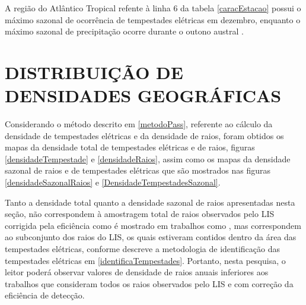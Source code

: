 A região do Atlântico Tropical refente à linha 6 da tabela \ref{caracEstacao} possui o máximo sazonal de ocorrência de tempestades elétricas em dezembro, enquanto o máximo sazonal de precipitação ocorre durante o outono austral \cite{cusdodioTese}.



\section{DISTRIBUIÇÃO DE DENSIDADES GEOGRÁFICAS}
\label{secaoDensidades}

Considerando o método descrito em \ref{metodoPass}, referente ao cálculo da densidade de tempestades elétricas e da densidade de raios, foram obtidos os mapas da densidade total de tempestades elétricas e de raios, figuras \ref{densidadeTempestade} e \ref{densidadeRaios}, assim como os mapas da densidade sazonal de raios e de tempestades elétricas que são mostrados nas  figuras \ref{densidadeSazonalRaios} e \ref{DensidadeTempestadesSazonal}. 

Tanto a densidade total quanto a densidade sazonal de raios apresentadas nesta seção, não correspondem à amostragem total de raios observados pelo LIS corrigida pela eficiência como é mostrado em trabalhos como   , mas correspondem ao subconjunto dos raios do LIS, os quais estiveram contidos dentro da área das tempestades elétricas, conforme descreve a metodologia de identificação das tempestades elétricas em \ref{identificaTempestades}. Portanto, nesta pesquisa, o leitor poderá observar valores de densidade de raios anuais inferiores aos trabalhos que consideram todos os raios observados pelo LIS e com correção da eficiência de detecção.


